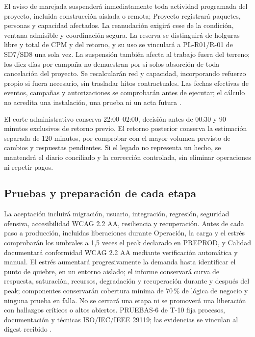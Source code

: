 El aviso de marejada suspenderá inmediatamente toda actividad programada del proyecto, incluida construcción aislada o remota; Proyecto registrará paquetes, personas y capacidad afectados. La reanudación exigirá cese de la condición, ventana admisible y coordinación segura. La reserva se distinguirá de holguras libre y total de CPM y del retorno, y su uso se vinculará a PL-R01/R-01 de SD7/SD8 una sola vez. La suspensión también afecta al trabajo fuera del terreno; los diez días por campaña no demuestran por sí solos absorción de toda cancelación del proyecto. Se recalcularán red y capacidad, incorporando refuerzo propio si fuera necesario, sin trasladar hitos contractuales. Las fechas efectivas de eventos, campañas y autorizaciones se comprobarán antes de ejecutar; el cálculo no acredita una instalación, una prueba ni un acta futura \parencite[cap.~10, restricción 12, p.~26; numeral 13.2, p.~29; cap.~15, RT-10.05, p.~34]{caso07}.

El corte administrativo conserva 22:00--02:00, decisión antes de 00:30 y 90 minutos exclusivos de retorno previo. El retorno posterior conserva la estimación separada de 120 minutos, por comprobar con el mayor volumen previsto de cambios y respuestas pendientes. Si el legado no representa un hecho, se mantendrá el diario conciliado y la corrección controlada, sin eliminar operaciones ni repetir pagos.




\subsection{Pruebas y preparación de cada etapa} %
La aceptación incluirá migración, usuario, integración, regresión, seguridad ofensiva, accesibilidad WCAG 2.2 AA, resiliencia y recuperación. Antes de cada paso a producción, incluidas liberaciones durante Operación, la carga y el estrés comprobarán los umbrales a 1,5 veces el peak declarado en PREPROD, y Calidad documentará conformidad WCAG 2.2 AA mediante verificación automática y manual. El estrés aumentará progresivamente la demanda hasta identificar el punto de quiebre, en un entorno aislado; el informe conservará curva de respuesta, saturación, recursos, degradación y recuperación durante y después del peak; componentes conservarán cobertura mínima de 70\,\% de lógica de negocio y ninguna prueba en falla. No se cerrará una etapa ni se promoverá una liberación con hallazgos críticos o altos abiertos. PRUEBAS-6 de T-10 fija procesos, documentación y técnicas ISO/IEC/IEEE 29119; las evidencias se vinculan al digest recibido \parencite[cap.~20, secc.~20.1, pp.~34--35]{bases-transversales}.

